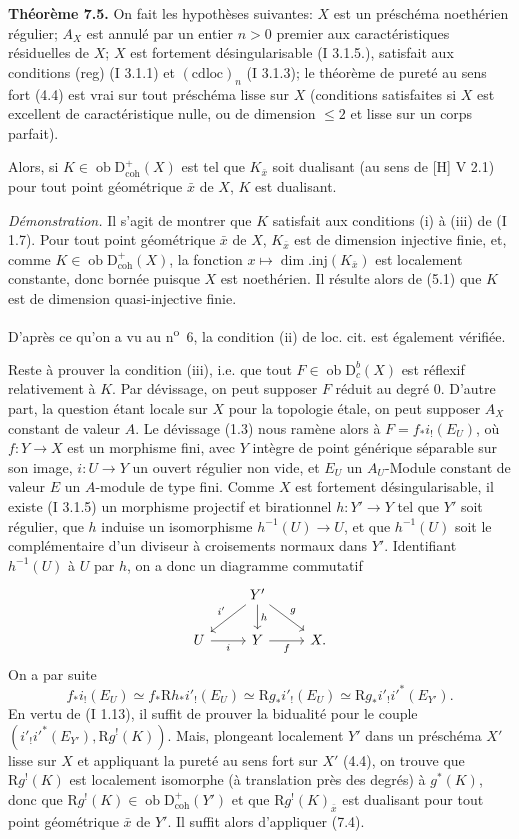 \documentclass[11pt]{article}
\newcommand{\R}{\mathrm{R}}
\newcommand{\D}{\mathrm{D}}
\newcommand{\ob}{\operatorname{ob}}
\providecommand{\ob}{\operatorname{ob}}
\begin{document}
\textbf{Théorème 7.5.} On fait les hypothèses suivantes: $X$ est un préschéma noethérien régulier; $A_X$ est annulé par un entier $n>0$ premier aux caractéristiques résiduelles de $X$; $X$ est fortement désingularisable (I 3.1.5.), satisfait aux conditions (reg) (I 3.1.1) et $(\mathrm{cdloc})_n$ (I 3.1.3); le théorème de pureté au sens fort (4.4) est vrai sur tout préschéma lisse sur $X$ (conditions satisfaites si $X$ est excellent de caractéristique nulle, ou de dimension $\leq2$ et lisse sur un corps parfait).

Alors, si $K\in\ob\D^{+}_{\mathrm{coh}}(X)$ est tel que $K_{\bar{x}}$ soit dualisant (au sens de [H] V 2.1) pour tout point géométrique $\bar{x}$ de $X$, $K$ est dualisant.

\emph{Démonstration.} Il s'agit de montrer que $K$ satisfait aux conditions (i) à (iii) de (I 1.7). Pour tout point géométrique $\bar{x}$ de $X$, $K_{\bar{x}}$ est de dimension injective finie, et, comme $K\in\ob\D^{+}_{\mathrm{coh}}(X)$, la fonction $x\mapsto \dim.\mathrm{inj}(K_{\bar{x}})$ est localement constante, donc bornée puisque $X$ est noethérien. Il résulte alors de (5.1) que $K$ est de dimension quasi-injective finie.

D'après ce qu'on a vu au n\textsuperscript{o}~6, la condition (ii) de loc. cit. est également vérifiée.

Reste à prouver la condition (iii), i.e. que tout $F\in\ob\D_c^b(X)$ est réflexif relativement à $K$. Par dévissage, on peut supposer $F$ réduit au degré $0$. D'autre part, la question étant locale sur $X$ pour la topologie étale, on peut supposer $A_X$ constant de valeur $A$. Le dévissage (1.3) nous ramène alors à $F=f_*i_!(E_U)$, où $f:Y\to X$ est un morphisme fini, avec $Y$ intègre de point générique séparable sur son image, $i:U\to Y$ un ouvert régulier non vide, et $E_U$ un $A_U$-Module constant de valeur $E$ un $A$-module de type fini. Comme $X$ est fortement désingularisable, il existe (I 3.1.5) un morphisme projectif et birationnel $h:Y'\to Y$ tel que $Y'$ soit régulier, que $h$ induise un isomorphisme $h^{-1}(U)\to U$, et que $h^{-1}(U)$ soit le complémentaire d'un diviseur à croisements normaux dans $Y'$. Identifiant $h^{-1}(U)$ à $U$ par $h$, on a donc un diagramme commutatif
\[
\begin{tikzcd}
& Y' \arrow[dl,"i'"'] \arrow[d,"h"] \arrow[dr,"g"] & \\
U \arrow[r,"i"'] & Y \arrow[r,"f"'] & X.
\end{tikzcd}
\]
On a par suite
\[
        f_*i_!(E_U)\simeq f_*\R h_* i'_!(E_U)\simeq \R g_* i'_!(E_U)\simeq \R g_* i'_! i'^*(E_{Y'}).
\]
En vertu de (I 1.13), il suffit de prouver la bidualité pour le couple $(i'_!i'^*(E_{Y'}),\R g^!(K))$. Mais, plongeant localement $Y'$ dans un préschéma $X'$ lisse sur $X$ et appliquant la pureté au sens fort sur $X'$ (4.4), on trouve que $\R g^!(K)$ est localement isomorphe (à translation près des degrés) à $g^*(K)$, donc que $\R g^!(K)\in\ob\D^{+}_{\mathrm{coh}}(Y')$ et que $\R g^!(K)_{\bar{x}}$ est dualisant pour tout point géométrique $\bar{x}$ de $Y'$. Il suffit alors d'appliquer (7.4).
\end{document}
